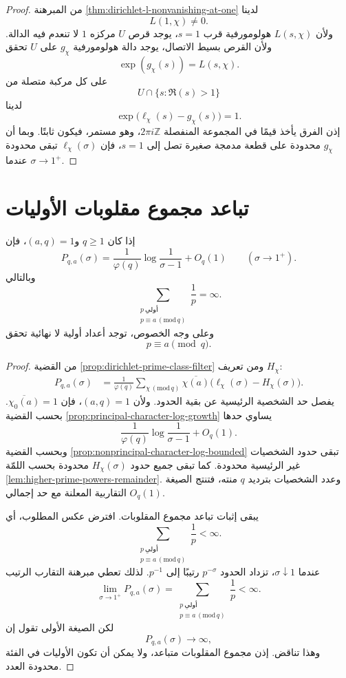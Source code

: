 \begin{proof}
من المبرهنة \ref{thm:dirichlet-l-nonvanishing-at-one} لدينا
\[
L(1,\chi)\ne0.
\]
ولأن \(L(s,\chi)\) هولومورفية قرب \(s=1\)، يوجد قرص \(U\) مركزه \(1\)
لا تنعدم فيه الدالة. ولأن القرص بسيط الاتصال، يوجد دالة هولومورفية
\(g_\chi\) على \(U\) تحقق
\[
\exp(g_\chi(s))=L(s,\chi).
\]
على كل مركبة متصلة من
\[
U\cap\{s:\Re(s)>1\}
\]
لدينا
\[
\exp\bigl(\ell_\chi(s)-g_\chi(s)\bigr)=1.
\]
إذن الفرق يأخذ قيمًا في المجموعة المنفصلة \(2\pi i\mathbb Z\)، وهو
مستمر، فيكون ثابتًا. وبما أن \(g_\chi\) محدودة على قطعة مدمجة صغيرة تصل
إلى \(s=1\)، فإن \(\ell_\chi(\sigma)\) تبقى محدودة عندما
\(\sigma\to1^+\).
\end{proof}

\section{تباعد مجموع مقلوبات الأوليات}

\begin{theorem}
\label{thm:dirichlet-primes-arithmetic-progressions}
\provedhere
إذا كان \(q\geq1\) و\((a,q)=1\)، فإن
\[
P_{q,a}(\sigma)
=
\frac1{\varphi(q)}
\log\frac1{\sigma-1}+O_q(1)
\qquad(\sigma\to1^+).
\]
وبالتالي
\[
\sum_{\substack{p\ \text{أولي}\\ p\equiv a\, (\mathrm{mod}\,q)}}
\frac1p=\infty.
\]
وعلى وجه الخصوص، توجد أعداد أولية لا نهائية تحقق
\[
p\equiv a\pmod q.
\]
\end{theorem}

\begin{proof}
من القضية \ref{prop:dirichlet-prime-class-filter} ومن تعريف
\(H_\chi\):
\begin{align*}
P_{q,a}(\sigma)
&=
\frac1{\varphi(q)}
\sum_{\chi\, (\mathrm{mod}\,q)}
\overline{\chi(a)}
\bigl(\ell_\chi(\sigma)-H_\chi(\sigma)\bigr).
\end{align*}
يفصل حد الشخصية الرئيسية عن بقية الحدود. ولأن \((a,q)=1\)، فإن
\(\overline{\chi_0(a)}=1\). بحسب القضية
\ref{prop:principal-character-log-growth} يساوي حدها
\[
\frac1{\varphi(q)}
\log\frac1{\sigma-1}+O_q(1).
\]
وبحسب القضية \ref{prop:nonprincipal-character-log-bounded} تبقى حدود
الشخصيات غير الرئيسية محدودة. كما تبقى جميع حدود \(H_\chi(\sigma)\)
محدودة بحسب اللمّة \ref{lem:higher-prime-powers-remainder}. وعدد الشخصيات
بترديد \(q\) منته، فتنتج الصيغة التقاربية المعلنة مع حد إجمالي
\(O_q(1)\).

يبقى إثبات تباعد مجموع المقلوبات. افترض عكس المطلوب، أي
\[
\sum_{\substack{p\ \text{أولي}\\ p\equiv a\, (\mathrm{mod}\,q)}}
\frac1p<\infty.
\]
عندما \(\sigma\downarrow1\)، تزداد الحدود \(p^{-\sigma}\) رتيبًا إلى
\(p^{-1}\). لذلك تعطي مبرهنة التقارب الرتيب
\[
\lim_{\sigma\to1^+}P_{q,a}(\sigma)
=
\sum_{\substack{p\ \text{أولي}\\ p\equiv a\, (\mathrm{mod}\,q)}}
\frac1p<\infty.
\]
لكن الصيغة الأولى تقول إن
\[
P_{q,a}(\sigma)\longrightarrow\infty,
\]
وهذا تناقض. إذن مجموع المقلوبات متباعد، ولا يمكن أن تكون الأوليات في
الفئة محدودة العدد.
\end{proof}

